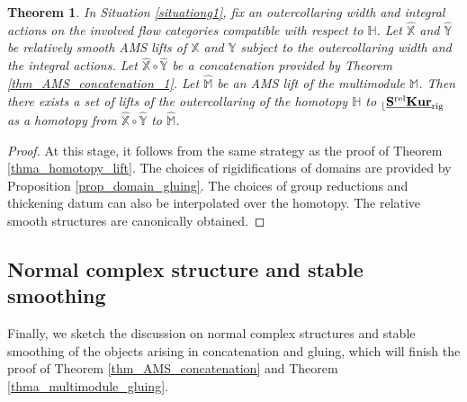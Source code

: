 \documentclass[reqno, 10pt]{amsart}
\numberwithin{equation}{section}
\numberwithin{equation}{section}
\newtheorem{thm}{Theorem}[section]
\theoremstyle{definition}
\theoremstyle{remark}
\newcommand{\mb}{\mathbb}
\renewcommand{\outer}{{}_{\lfloor}}
\newcommand{\uds}[1]{\underline{\smash{#1}}}
\begin{document}
\begin{thm}\label{thm_AMS_gluing_1}
In Situation \ref{situationg1}, fix an outercollaring width and integral actions on the involved flow categories compatible with respect to ${\mb H}$. Let $\hat{\mb X}$ and $\hat{\mb Y}$ be relatively smooth AMS lifts of ${\mb X}$ and ${\mb Y}$ subject to the outercollaring width and the integral actions. Let $\hat{\mb X} \circ \hat{\mb Y}$ be a concatenation provided by Theorem \ref{thm_AMS_concatenation_1}. Let $\hat{\mb M}$ be an AMS lift of the multimodule ${\mb M}$. Then there exists a set of lifts of the outercollaring of the homotopy ${\mb H}$ to $\outer \uds{\bf S^{\rm rel} Kur}_{\rm rig}$ as a homotopy from $\hat{\mb X} \circ \hat {\mb Y}$ to $\hat {\mb M}$.    
\end{thm}


\begin{proof}
At this stage, it follows from the same strategy as the proof of Theorem \ref{thma_homotopy_lift}. The choices of rigidifications of domains are provided by Proposition \ref{prop_domain_gluing}. The choices of group reductions and thickening datum can also be interpolated over the homotopy. The relative smooth structures are canonically obtained.  
\end{proof}



\subsection{Normal complex structure and stable smoothing}

Finally, we sketch the discussion on normal complex structures and stable smoothing of the objects arising in concatenation and gluing, which will finish the proof of Theorem \ref{thm_AMS_concatenation} and Theorem \ref{thma_multimodule_gluing}.
\end{document}
